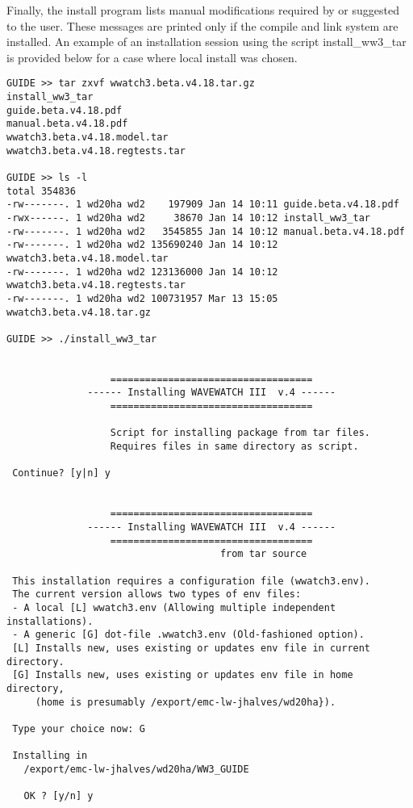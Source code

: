 Finally, the install program lists manual modifications required by or
suggested to the user. These messages are printed only if the compile and link
system are installed. An example of an installation session using the script
{\file install\_ww3\_tar} is provided below for a case where local install was
chosen.

\begin{minipage}[c]{4.5in}
{\scriptsize \begin{verbatim}
GUIDE >> tar zxvf wwatch3.beta.v4.18.tar.gz 
install_ww3_tar
guide.beta.v4.18.pdf
manual.beta.v4.18.pdf
wwatch3.beta.v4.18.model.tar
wwatch3.beta.v4.18.regtests.tar

GUIDE >> ls -l
total 354836
-rw-------. 1 wd20ha wd2    197909 Jan 14 10:11 guide.beta.v4.18.pdf
-rwx------. 1 wd20ha wd2     38670 Jan 14 10:12 install_ww3_tar
-rw-------. 1 wd20ha wd2   3545855 Jan 14 10:12 manual.beta.v4.18.pdf
-rw-------. 1 wd20ha wd2 135690240 Jan 14 10:12 wwatch3.beta.v4.18.model.tar
-rw-------. 1 wd20ha wd2 123136000 Jan 14 10:12 wwatch3.beta.v4.18.regtests.tar
-rw-------. 1 wd20ha wd2 100731957 Mar 13 15:05 wwatch3.beta.v4.18.tar.gz

GUIDE >> ./install_ww3_tar 


                  ===================================
              ------ Installing WAVEWATCH III  v.4 ------
                  =================================== 

                  Script for installing package from tar files. 
                  Requires files in same directory as script.

 Continue? [y|n] y


                  ===================================
              ------ Installing WAVEWATCH III  v.4 ------
                  ===================================
                                     from tar source 

 This installation requires a configuration file (wwatch3.env).
 The current version allows two types of env files: 
 - A local [L] wwatch3.env (Allowing multiple independent installations).
 - A generic [G] dot-file .wwatch3.env (Old-fashioned option).
 [L] Installs new, uses existing or updates env file in current directory.
 [G] Installs new, uses existing or updates env file in home directory, 
     (home is presumably /export/emc-lw-jhalves/wd20ha}). 

 Type your choice now: G

 Installing in 
   /export/emc-lw-jhalves/wd20ha/WW3_GUIDE

   OK ? [y/n] y

\end{verbatim}}
\end{minipage}

